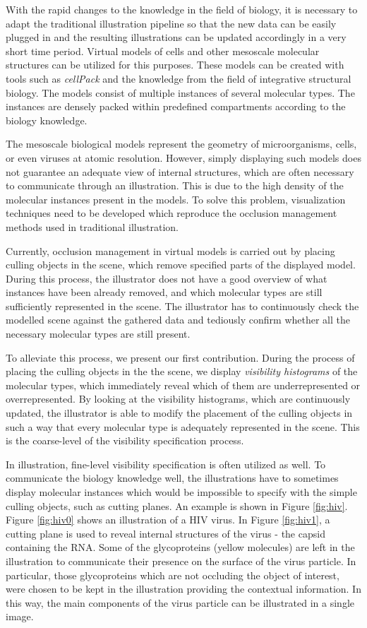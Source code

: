 With the rapid changes to the knowledge in the field of biology, it is necessary to adapt the traditional illustration pipeline so that the new data can be easily plugged in and the resulting illustrations can be updated accordingly in a very short time period.
Virtual models of cells and other mesoscale molecular structures can be utilized for this purposes.
These models can be created with tools such as \emph{cellPack} \cite{cellpack} and the knowledge from the field of integrative structural biology.
The models consist of multiple instances of several molecular types.
The instances are densely packed within predefined compartments according to the biology knowledge.

The mesoscale biological models represent the geometry of microorganisms, cells, or even viruses at atomic resolution.
However, simply displaying such models does not guarantee an adequate view of internal structures, which are often necessary to communicate through an illustration.
This is due to the high density of the molecular instances present in the models.
To solve this problem, visualization techniques need to be developed which reproduce the occlusion management methods used in traditional illustration.

Currently, occlusion management in virtual models is carried out by placing culling objects in the scene, which remove specified parts of the displayed model.
During this process, the illustrator does not have a good overview of what instances have been already removed, and which molecular types are still sufficiently represented in the scene.
The illustrator has to continuously check the modelled scene against the gathered data and tediously confirm whether all the necessary molecular types are still present.

To alleviate this process, we present our first contribution.
During the process of placing the culling objects in the the scene, we display \emph {visibility histograms} of the molecular types, which immediately reveal which of them are underrepresented or overrepresented.
By looking at the visibility histograms, which are continuously updated, the illustrator is able to modify the placement of the culling objects in such a way that every molecular type is adequately represented in the scene.
This is the coarse-level of the visibility specification process.

In illustration, fine-level visibility specification is often utilized as well.
To communicate the biology knowledge well, the illustrations have to sometimes display molecular instances which would be impossible to specify with the simple culling objects, such as cutting planes.
An example is shown in Figure \ref{fig:hiv}.
Figure \ref{fig:hiv0} shows an illustration of a HIV virus.
In Figure \ref{fig:hiv1}, a cutting plane is used to reveal internal structures of the virus - the capsid containing the RNA.
Some of the glycoproteins (yellow molecules) are left in the illustration to communicate their presence on the surface of the virus particle.
In particular, those glycoproteins which are not occluding the object of interest, were chosen to be kept in the illustration providing the contextual information.
In this way, the main components of the virus particle can be illustrated in a single image.

